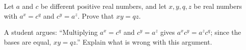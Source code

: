 Let $a$ and $c$ be different positive real numbers, and let $x,y,q,z$ be real numbers with $a^x=c^q$ and $c^y=a^z$. Prove that $xy=qz$.

A student argues: ``Multiplying $a^x=c^q$ and $c^y=a^z$ gives $a^xc^y=a^zc^q$; since the bases are equal, $xy=qz$.'' Explain what is wrong with this argument.
